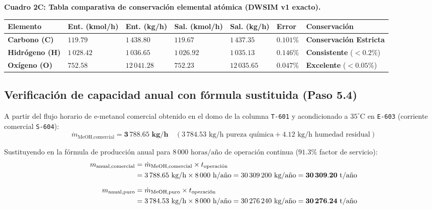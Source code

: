 \documentclass[11pt,letterpaper]{article}
\begin{document}
\begin{center}
\small
\setlength{\tabcolsep}{3.5pt}
\textbf{Cuadro 2C: Tabla comparativa de conservación elemental atómica (DWSIM v1 exacto).}\\[3pt]
\begin{tabularx}{\textwidth}{>{\raggedright\arraybackslash}p{2.4cm} >{\centering\arraybackslash}p{1.9cm} >{\centering\arraybackslash}p{1.9cm} >{\centering\arraybackslash}p{1.9cm} >{\centering\arraybackslash}p{1.9cm} >{\centering\arraybackslash}p{1.4cm} >{\centering\arraybackslash}X}
\toprule
\textbf{Elemento} & \textbf{Ent. (kmol/h)} & \textbf{Ent. (kg/h)} & \textbf{Sal. (kmol/h)} & \textbf{Sal. (kg/h)} & \textbf{Error} & \textbf{Conservación} \\
\midrule
\textbf{Carbono (C)} & $119.79$ & $1\,438.80$ & $119.67$ & $1\,437.35$ & $\mathbf{0.101\%}$ & \textbf{Conservación Estricta} \\
\textbf{Hidrógeno (H)} & $1\,028.42$ & $1\,036.65$ & $1\,026.92$ & $1\,035.13$ & $\mathbf{0.146\%}$ & \textbf{Consistente} ($<0.2\%$) \\
\textbf{Oxígeno (O)} & $752.58$ & $12\,041.28$ & $752.23$ & $12\,035.65$ & $\mathbf{0.047\%}$ & \textbf{Excelente} ($<0.05\%$) \\
\bottomrule
\end{tabularx}
\end{center}

\vspace{0.4cm}
\subsection{Verificación de capacidad anual con fórmula sustituida (Paso 5.4)}

A partir del flujo horario de e-metanol comercial obtenido en el domo de la columna \texttt{T-601} y acondicionado a $35^\circ\text{C}$ en \texttt{E-603} (corriente comercial \texttt{S-604}):
\begin{equation}
\dot{m}_{\text{MeOH,comercial}} = \mathbf{3\,788.65\text{ kg/h}} \quad (3\,784.53\text{ kg/h pureza química} + 4.12\text{ kg/h humedad residual})
\end{equation}

Sustituyendo en la fórmula de producción anual para $8\,000\text{ horas/año}$ de operación continua ($91.3\%$ factor de servicio):
\begin{align}
m_{\text{anual,comercial}} &= \dot{m}_{\text{MeOH,comercial}} \times t_{\text{operación}} \notag \\
&= 3\,788.65\text{ kg/h} \times 8\,000\text{ h/año} = 30\,309\,200\text{ kg/año} = \mathbf{30\,309.20\text{ t/año}} \\[6pt]
m_{\text{anual,puro}} &= \dot{m}_{\text{MeOH,puro}} \times t_{\text{operación}} \notag \\
&= 3\,784.53\text{ kg/h} \times 8\,000\text{ h/año} = 30\,276\,240\text{ kg/año} = \mathbf{30\,276.24\text{ t/año}}
\end{align}
\end{document}
